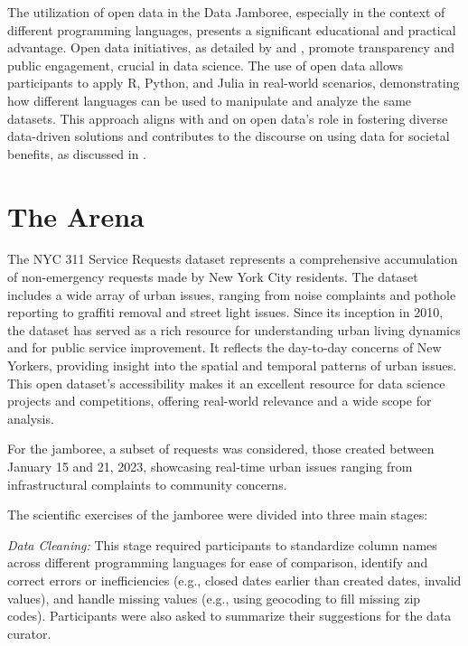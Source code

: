 \documentclass[12pt, letterpaper]{article}
\begin{document}
The utilization of open data in the Data Jamboree, especially in the context of
different programming languages, presents a significant educational and
practical advantage. Open data initiatives, as detailed by
\citet{beheshti2019datasynapse} and \citet{janssen2012benefits}, promote
transparency and public engagement, crucial in data science. The use of open
data allows participants to apply R, Python, and Julia in real-world scenarios,
demonstrating how different languages can be used to manipulate and analyze the
same datasets. This approach aligns with \citet{borgman2012conundrum} and
\citet{cantor2018facets} on open data's role in fostering diverse data-driven
solutions and contributes to the discourse on using data for societal benefits,
as discussed in \citet{ridgway2023data}.


\section{The Arena}
\label{sec:arena}

The NYC 311 Service Requests dataset represents a comprehensive accumulation of
non-emergency requests made by New York City residents. The dataset includes a
wide array of urban issues, ranging from noise complaints and pothole reporting
to graffiti removal and street light issues. Since its inception in 2010, the
dataset has served as a rich resource for understanding urban living dynamics
and for public service improvement. It reflects the day-to-day concerns of New
Yorkers, providing insight into the spatial and temporal patterns of urban
issues. This open dataset's accessibility makes it an excellent resource for
data science projects and competitions, offering real-world relevance and a wide
scope for analysis.


For the jamboree, a  subset of requests was considered, those created between
January 15 and 21, 2023, showcasing real-time urban issues ranging from
infrastructural complaints to community concerns.


The scientific exercises of the jamboree were divided into three main stages:

\emph{Data Cleaning:} This stage required participants to standardize column
names across different programming languages for ease of comparison, identify
and correct errors or inefficiencies (e.g., closed dates earlier than created
dates, invalid values), and handle missing values (e.g., using geocoding to fill
missing zip codes). Participants were also asked to summarize their suggestions
for the data curator.
\end{document}
